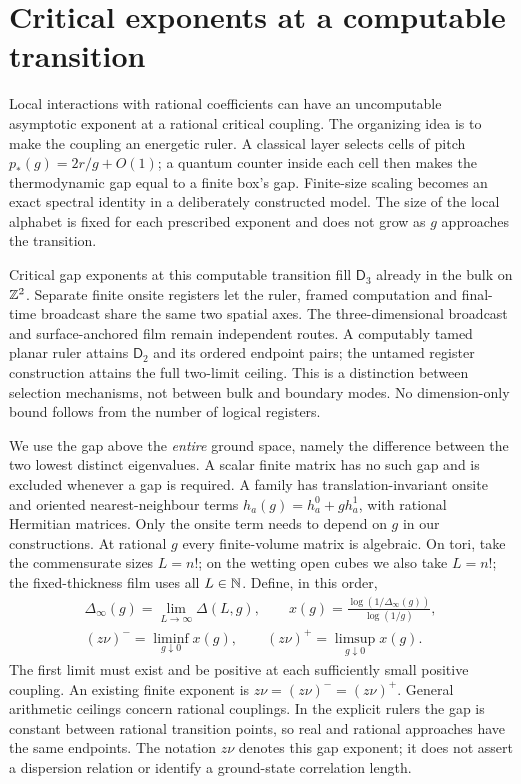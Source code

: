 \section{Critical exponents at a computable transition}\label{sec:intro}
Local interactions with rational coefficients can have an uncomputable
asymptotic exponent at a rational critical coupling. The organizing idea
is to make the coupling an energetic ruler. A classical layer selects
cells of pitch $p_*(g)=2r/g+O(1)$; a quantum counter inside each cell
then makes the thermodynamic gap equal to a finite box's gap. Finite-size
scaling becomes an exact spectral identity in a deliberately constructed
model. The size of the local alphabet is fixed for each prescribed
exponent and does not grow as $g$ approaches the transition.

Critical gap exponents at this computable transition fill $\mathsf D_3$
already in the bulk on $\mathbb Z^2$. Separate finite onsite registers let
the ruler, framed computation and final-time broadcast share the same
two spatial axes. The three-dimensional broadcast and surface-anchored
film remain independent routes. A computably tamed planar ruler attains
$\mathsf D_2$ and its ordered endpoint pairs; the untamed register
construction attains the full two-limit ceiling. This is a distinction
between selection mechanisms, not between bulk and boundary modes.
No dimension-only bound follows from the number of logical registers.

We use the gap above the \emph{entire} ground space, namely the difference
between the two lowest distinct eigenvalues. A scalar finite matrix has
no such gap and is excluded whenever a gap is required. A family has
translation-invariant onsite and oriented nearest-neighbour terms
$h_a(g)=h_a^0+g h_a^1$, with rational Hermitian matrices. Only the onsite
term needs to depend on $g$ in our constructions. At rational $g$ every
finite-volume matrix is algebraic. On tori, take the commensurate sizes
$L=n!$; on the wetting open cubes we also take $L=n!$; the fixed-thickness film uses all $L\in\mathbb N$. Define, in this order,
\begin{equation}\label{eq:critical-definition}
 \begin{gathered}
 \Delta_\infty(g)=\lim_{L\to\infty}\Delta(L,g),\qquad
 x(g)=\frac{\log(1/\Delta_\infty(g))}{\log(1/g)},\\
 (z\nu)^-=\liminf_{g\downarrow0}x(g),\qquad
 (z\nu)^+=\limsup_{g\downarrow0}x(g).
 \end{gathered}
\end{equation}
The first limit must exist and be positive at each sufficiently small
positive coupling. An existing finite exponent is $z\nu=(z\nu)^-=(z\nu)^+$.
General arithmetic ceilings concern rational couplings. In the explicit
rulers the gap is constant between rational transition points, so real
and rational approaches have the same endpoints. The notation $z\nu$
denotes this gap exponent; it does not assert a dispersion relation or
identify a ground-state correlation length.

